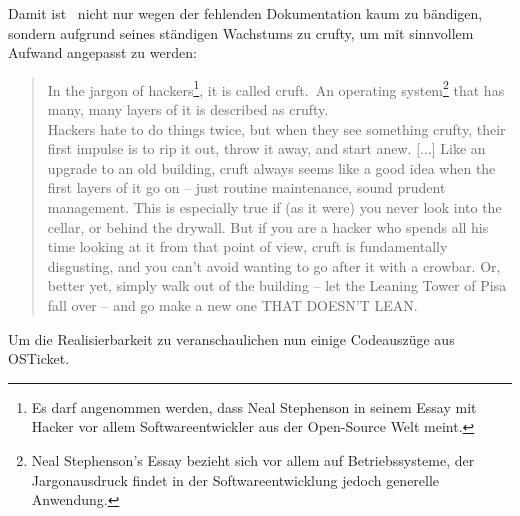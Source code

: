 Damit ist \getOst\ nicht nur wegen der fehlenden Dokumentation kaum zu bändigen, sondern aufgrund seines ständigen Wachstums zu \glqq crufty\grqq , um mit sinnvollem Aufwand angepasst zu werden:

\blockcquote{cmdlinestephenson}{
	 In the jargon of hackers\footnote{Es darf angenommen werden, dass Neal Stephenson in seinem Essay mit Hacker vor allem Softwareentwickler aus der Open-Source Welt meint.}, it is called
	\glqq cruft.\grqq\ An operating system\footnote{Neal Stephenson's Essay bezieht sich vor allem auf Betriebssysteme, der Jargonausdruck findet in der Softwareentwicklung jedoch generelle Anwendung.} that has many, many layers of it is described as \glqq crufty.\grqq \\
	Hackers hate to do things twice, but when they see something crufty, their first impulse
	is to rip it out, throw it away, and start anew.
	[...]
	Like an upgrade to an old building, cruft always seems like a good idea when the first layers of it go on – just routine maintenance, sound prudent management. This is especially true if (as it were) you never look into the cellar, or behind the drywall. But if you are a hacker who spends all his time looking at it from that point of view, cruft is fundamentally disgusting, and you can’t avoid wanting to go after it with a crowbar. Or, better yet, simply walk out of the building – let the Leaning Tower of Pisa fall over – and go make a new one THAT DOESN’T LEAN.
}

Um die Realisierbarkeit zu veranschaulichen nun einige Codeauszüge aus OSTicket.
\newpage
